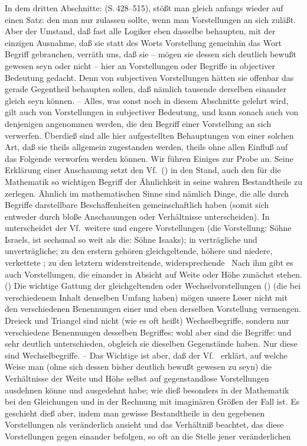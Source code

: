 In dem dritten Abschnitte:  (S.\,428--515), stößt man gleich anfangs  wieder auf einen Satz:  den man nur zulassen sollte, wenn man Vorstellungen an sich zuläßt. Aber der Umstand, daß fast alle Logiker eben dasselbe behaupten, mit der einzigen Ausnahme, daß sie statt des Worts Vorstellung gemeinhin das Wort Begriff gebrauchen, verräth uns, daß sie -- mögen sie dessen sich deutlich bewußt gewesen seyn oder nicht -- hier an Vorstellungen oder Begriffe in objectiver Bedeutung gedacht. Denn von subjectiven Vorstellungen hätten sie offenbar das gerade Gegentheil behaupten sollen, daß nämlich tausende derselben einander gleich seyn können. -- Alles, was sonst noch in diesem Abschnitte  gelehrt wird, gilt auch von Vorstellungen in subjectiver Bedeutung, und kann sonach auch von denjenigen angenommen werden, die den Begriff einer Vorstellung an sich verwerfen. Überdieß sind alle hier aufgestellten Behauptungen von einer solchen Art, daß sie theils allgemein zugestanden werden, theils ohne allen Einfluß auf das Folgende verworfen werden können. Wir führen Einiges zur Probe an. Seine Erklärung einer Anschauung setzt den Vf.\ () in den Stand, auch den für die Mathematik so wichtigen Begriff der Ähnlichkeit in seine wahren Bestandtheile zu zerlegen. Ähnlich im mathematischen Sinne sind nämlich Dinge, die alle durch Begriffe darstellbare Beschaffenheiten gemeinschaftlich haben (somit sich entweder durch bloße Anschauungen oder Verhältnisse unterscheiden). In  unterscheidet der Vf.\ weitere und engere Vorstellungen (die Vorstellung: Söhne Israels, ist sechsmal so weit als die: Söhne Isaaks); in  verträgliche und unverträgliche; zu den erstern gehören gleichgeltende, höhere und niedere, verkettete \usw ; zu den letztern widerstreitende, widersprechende \usw\ Nach ihm gibt es auch Vorstellungen, die einander in Absicht auf Weite oder Höhe zunächst stehen. () Die wichtige Gattung der gleichgeltenden oder Wechselvorstellungen () (die bei verschiedenem Inhalt denselben Umfang haben) mögen unsere Leser nicht mit den verschiedenen Benennungen einer und eben derselben Vorstellung vermengen. Dreieck und Triangel sind nicht (wie es oft heißt) Wechselbegriffe, sondern nur verschiedene Benennungen desselben Begriffes; wohl aber sind die Begriffe:  und  sehr deutlich unterschieden, obgleich sie dieselben Gegenstände haben. Nur diese sind Wechselbegriffe. -- Das Wichtige ist aber, daß der Vf.\  erklärt, auf welche Weise man (ohne sich dessen bisher deutlich bewußt gewesen zu seyn) die Verhältnisse der Weite und Höhe selbst auf gegenstandlose Vorstellungen ausdehnen könne und ausgedehnt habe; wie dieß besonders in der Mathematik bei den Gleichungen und in der Rechnung mit imaginären Größen der Fall ist. Es geschieht dieß aber,  indem man gewisse Bestandtheile in den gegebenen Vorstellungen als veränderlich ansieht und das Verhältniß beachtet, das diese Vorstellungen gegen einander befolgen, so oft an die Stelle jener veränderlichen 